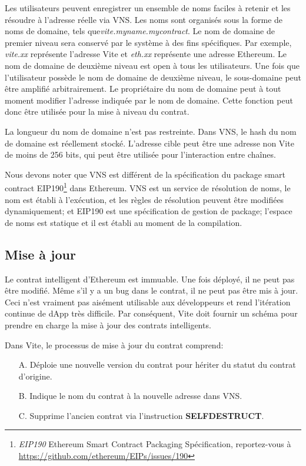 \documentclass[UTF8,nofonts]{article}
\begin{document}
\begin{multicols}{2}
Les utilisateurs peuvent enregistrer un ensemble de noms faciles à retenir et les résoudre à l'adresse réelle via VNS. Les noms sont organisés sous la forme de noms de domaine, tels que\textit{vite.myname.mycontract}. Le nom de domaine de premier niveau sera conservé par le système à des fins spécifiques. Par exemple, \textit{vite.xx} représente l'adresse Vite et \textit{eth.xx} représente une adresse Ethereum. Le nom de domaine de deuxième niveau est open à tous les utilisateurs. Une fois que l'utilisateur possède le nom de domaine de deuxième niveau, le sous-domaine peut être amplifié arbitrairement. Le propriétaire du nom de domaine peut à tout moment modifier l'adresse indiquée par le nom de domaine. Cette fonction peut donc être utilisée pour la mise à niveau du contrat.

La longueur du nom de domaine n'est pas restreinte. Dans VNS, le hash du nom de domaine est réellement stocké. L'adresse cible peut être une adresse non Vite de moins de 256 bits, qui peut être utilisée pour l'interaction entre chaînes.

Nous devons noter que VNS est différent de la spécification du package smart contract EIP190\footnote{\textit{EIP190} Ethereum Smart Contract Packaging Spécification, reportez-vous à \url{https://github.com/ethereum/EIPs/issues/190}} dans Ethereum. VNS est un service de résolution de noms, le nom est établi à l'exécution, et les règles de résolution peuvent être modifiées dynamiquement; 
et EIP190 est une spécification de gestion de package; l'espace de noms est statique et il est établi au moment de la compilation.

\subsection{Mise à jour}
Le contrat intelligent d'Ethereum est immuable. Une fois déployé, il ne peut pas être modifié. Même s'il y a un bug dans le contrat, il ne peut pas être mis à jour. Ceci n'est vraiment pas aisément utilisable aux développeurs et rend l'itération continue de dApp très difficile. Par conséquent, Vite doit fournir un schéma pour prendre en charge la mise à jour des contrats intelligents.

Dans Vite, le processus de mise à jour du contrat comprend:
\begin{itemize}
	\item[A.] Déploie une nouvelle version du contrat pour hériter du statut du contrat d'origine.
	\item[B.] Indique le nom du contrat à la nouvelle adresse dans VNS.
	\item[C.] Supprime l'ancien contrat via l'instruction \textbf{SELFDESTRUCT}.
\end{itemize}


\end{multicols}
\end{document}
